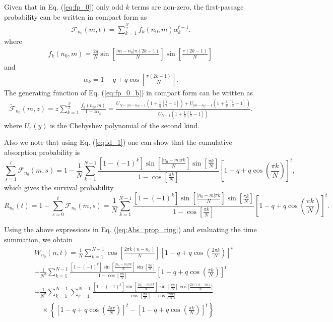 \documentclass[superscriptaddress, amsmath, amssymb, aps, pre, floatfix]{revtex4-2}
\begin{document}
Given that in Eq. (\ref{eq:fp_0}) only odd $k$ terms are non-zero, the first-passage probability can be written in compact form as
\begin{align}
\mathcal{F}_{n_0}(m,t)=\sum_{k=1}^{\frac{N}{2}}f_{k}(n_0,m)\alpha_k^{t-1}.
\label{eq:fp_0_b}
\end{align}
where
\begin{align}
f_k(n_0,m)=\frac{2q}{N}\sin\left[\frac{|m-n_0|\pi (2k-1)}{N}\right]\sin\left[\frac{\pi (2k-1)}{N}\right]\,
\label{eq:fn0m}
\end{align}
and
\begin{align}
\alpha_{k}=1-q+q\cos\left[\frac{\pi(2k-1)}{N}\right].
\label{eq:alpha_k}
\end{align}
The generating function of Eq. (\ref{eq:fp_0_b}) in compact form can be written as
\begin{align}
\widetilde{\mathcal{F}}_{n_0}(m,z)=z\sum_{k=1}^{\frac{N}{2}}\frac{f_k(n_0,m)}{1-z\alpha_k}=\frac{U_{N-|m-n_0|-1}\left(1+\frac{1}{q}\left[\frac{1}{z}-1\right]\right)+U_{|m-n_0|-1}\left(1+\frac{1}{q}\left[\frac{1}{z}-1\right]\right)}{U_{N-1}\left(1+\frac{1}{q}\left[\frac{1}{z}-1\right]\right)}.
\label{eq:fp_0_z}
\end{align}
where $U_r(y)$ is the Chebyshev polynomial of the second kind.


Also we note that using Eq. (\ref{eq:id_1}) one can show that the cumulative absorption probability is $$\sum_{s=1}^t \mathcal{F}_{n_0}(m,s)=1-\frac{1}{N}\sum_{k=1}^{N-1}\frac{\left[1-(-1)^k\right]\sin\left[\frac{|n_0-m|\pi k}{N}\right]\sin\left[\frac{\pi k}{N}\right]}{1-\cos\left[\frac{\pi k}{N}\right]}\left[1-q+q\cos\left(\frac{\pi k}{N}\right)\right]^{t},$$ which gives the survival probability $$R_{n_0}(t)=1-\sum_{s=0}^t \mathcal{F}_{n_0}(m,s)=\frac{1}{N}\sum_{k=1}^{N-1}\frac{\left[1-(-1)^k\right]\sin\left[\frac{|n_0-m|\pi k}{N}\right]\sin\left[\frac{\pi k}{N}\right]}{1-\cos\left[\frac{\pi k}{N}\right]}\left[1-q+q\cos\left(\frac{\pi k}{N}\right)\right]^{t}.$$

Using the above expressions in Eq. (\ref{eq:Abs_prop_ring}) and evaluating the time summation, we obtain
\begin{align}
&W_{n_0}(n,t)=\frac{1}{N}\sum_{k=1}^{N-1}\cos\left[\frac{2\pi k (n-n_0)}{N}\right]\left[1-q+q\cos\left(\frac{2\pi k}{N}\right)\right]^t\nonumber \\
&+\frac{1}{N^2}\sum_{k=1}^{N-1}\frac{\left[1-(-1)^k\right]\sin\left[\frac{|n_0-m|\pi k}{N}\right]\sin\left[\frac{\pi k}{N}\right]}{1-\cos\left[\frac{\pi k}{N}\right]}\left[1-q+q\cos\left(\frac{\pi k}{N}\right)\right]^{t}\nonumber \\
&+\frac{1}{N^2}\sum_{k=1}^{N-1}\sum_{r=1}^{N-1}\frac{\left[1-(-1)^k\right]\sin\left[\frac{|n_0-m|\pi k}{N}\right]\sin\left[\frac{\pi k}{N}\right]\cos\Big[\frac{2\pi r (n-m)}{N}\Big]}{\cos\left[\frac{\pi k}{N}\right]-\cos\Big[\frac{2\pi r}{N}\Big]}\nonumber\\
&\quad\times\left\{\left[1-q+q\cos\left(\frac{2\pi r}{N}\right)\right]^t-\left[1-q+q\cos\left(\frac{\pi k}{N}\right)\right]^t\right\}
\end{align}
\end{document}
